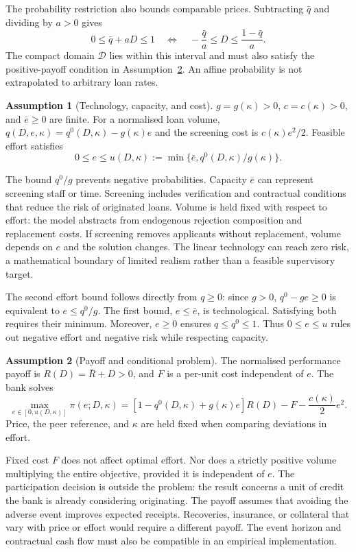 \documentclass[11pt]{article}
\theoremstyle{definition}\newtheorem{assumption}{Assumption}
\begin{document}
The probability restriction also bounds comparable prices. Subtracting
$\bar q$ and dividing by $a>0$ gives
\[
0\le\bar q+aD\le1
\quad\Longleftrightarrow\quad
-\frac{\bar q}{a}\le D\le\frac{1-\bar q}{a}.
\]
The compact domain $\mathcal D$ lies within this interval and must also
satisfy the positive-payoff condition in Assumption~\ref{as:payoff}.
An affine probability is not extrapolated to arbitrary loan rates.

\begin{assumption}[Technology, capacity, and cost]\label{as:technology}
$g=g(\kappa)>0$, $c=c(\kappa)>0$, and $\bar e\ge0$ are finite. For a
normalised loan volume, $q(D,e,\kappa)=q^0(D,\kappa)-g(\kappa)e$ and the
screening cost is $c(\kappa)e^2/2$. Feasible effort satisfies
\[
0\le e\le u(D,\kappa):=\min\{\bar e,q^0(D,\kappa)/g(\kappa)\}.
\]
\end{assumption}
The bound $q^0/g$ prevents negative probabilities. Capacity $\bar e$ can
represent screening staff or time. Screening includes verification and
contractual conditions that reduce the risk of originated loans. Volume is
held fixed with respect to effort: the model abstracts from endogenous
rejection composition and replacement costs. If screening removes applicants
without replacement, volume depends on $e$ and the solution changes. The
linear technology can reach zero risk, a mathematical boundary of limited
realism rather than a feasible supervisory target.

The second effort bound follows directly from $q\ge0$: since $g>0$,
$q^0-ge\ge0$ is equivalent to $e\le q^0/g$. The first bound,
$e\le\bar e$, is technological. Satisfying both requires their minimum.
Moreover, $e\ge0$ ensures $q\le q^0\le1$. Thus $0\le e\le u$ rules out
negative effort and negative risk while respecting capacity.

\begin{assumption}[Payoff and conditional problem]\label{as:payoff}
The normalised performance payoff is $R(D)=\bar R+D>0$, and $F$ is a
per-unit cost independent of $e$. The bank solves
\begin{equation}\label{eq:problem}
\max_{e\in[0,u(D,\kappa)]}\pi(e;D,\kappa)
=[1-q^0(D,\kappa)+g(\kappa)e]R(D)-F-\frac{c(\kappa)}2e^2.
\end{equation}
Price, the peer reference, and $\kappa$ are held fixed when comparing
deviations in effort.
\end{assumption}
Fixed cost $F$ does not affect optimal effort. Nor does a strictly positive
volume multiplying the entire objective, provided it is independent of $e$.
The participation decision is outside the problem: the result concerns a
unit of credit the bank is already considering originating. The payoff assumes
that avoiding the adverse event improves expected receipts. Recoveries,
insurance, or collateral that vary with price or effort would require a
different payoff. The event horizon and contractual cash flow must also be
compatible in an empirical implementation.
\end{document}
